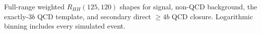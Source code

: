 Full-range weighted $R_{HH}(125,120)$ shapes for signal, non-QCD background, the exactly-$3b$ QCD template, and secondary direct $\geq4b$ QCD closure. Logarithmic binning includes every simulated event.
